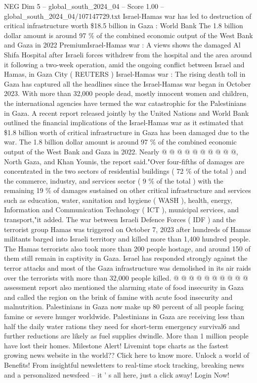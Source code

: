 \begin{textsample}{NEG Dim 5 – global\_south\_2024\_04 – Score 1.00 – global\_south\_2024\_04/107147729.txt}  \label{ex:f5_neg_184}
Israel-Hamas war has led to destruction of critical infrastructure worth \$18.5 billion in Gaza : World Bank The 1.8 billion dollar amount is around 97 \% of the combined economic output of the West Bank and Gaza in 2022 PremiumIsrael-Hamas war : A views shows the damaged Al Shifa Hospital after Israeli forces withdrew from the hospital and the area around it following a two-week operation, amid the ongoing conflict between Israel and Hamas, in Gaza City ( REUTERS ) Israel-Hamas war : The rising death toll in Gaza has captured all the headlines since the Israel-Hamas war began in October 2023.
With more than 32,000 people dead, mostly innocent women and children, the international agencies have termed the war catastrophic for the Palestinians in Gaza.
A recent report released jointly by the United Nations and World Bank outlined the financial implications of the Israel-Hamas war as it estimated that \$1.8 billion worth of critical infrastructure in Gaza has been damaged due to the war.
The 1.8 billion dollar amount is around 97 \% of the combined economic output of the West Bank and Gaza in 2022.
Nearly @ @ @ @ @ @ @ @ @ @, North Gaza, and Khan Younis, the report said."Over four-fifths of damages are concentrated in the two sectors of residential buildings ( 72 \% of the total ) and the commerce, industry, and services sector ( 9 \% of the total ) with the remaining 19 \% of damages sustained on other critical infrastructure and services such as education, water, sanitation and hygiene ( WASH ), health, energy, Information and Communication Technology ( ICT ), municipal services, and transport,"it added.
The war between Israeli Defence Forces ( IDF ) and the terrorist group Hamas was triggered on October 7, 2023 after hundreds of Hamas militants barged into Israeli territory and killed more than 1,400 hundred people.
The Hamas terrorists also took more than 200 people hostage, and around 150 of them still remain in captivity in Gaza.
Israel has responded strongly against the terror attacks and most of the Gaza infrastructure was demolished in its air raids over the terrorists with more than 32,000 people killed. @ @ @ @ @ @ @ @ @ @ assessment report also mentioned the alarming state of food insecurity in Gaza and called the region on the brink of famine with acute food insecurity and malnutrition.
Palestinians in Gaza now make up 80 percent of all people facing famine or severe hunger worldwide.
Palestinians in Gaza are receiving less than half the daily water rations they need for short-term emergency survival6 and further reductions are likely as fuel supplies dwindle.
More than 1 million people have lost their homes.
Milestone Alert!
Livemint tops charts as the fastest growing news website in the world??
Click here to know more.
Unlock a world of Benefits!
From insightful newsletters to real-time stock tracking, breaking news and a personalized newsfeed -- it ' s all here, just a click away!
Login Now!

\end{textsample}
